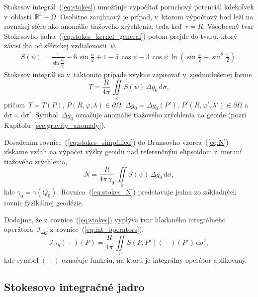 \documentclass[a4paper,12pt]{book}
\newcommand{\diff}{\mathrm d}
\begin{document}
Stokesov integrál~(\ref{eq:stokes}) umožňuje vypočítať poruchový potenciál 
kdekoľvek v~oblasti~$\mathbb{R}^3 - \overline\Omega$.  Osobitne zaujímavý je 
prípad, v~ktorom výpočtový bod leží na rovnakej sfére ako anomálie tiažového 
zrýchlenia, teda keď~$r = R$.  Všeobecný tvar Stokesovho 
jadra~(\ref{eq:stokes_kernel_general}) potom prejde do tvaru, ktorý závisí iba 
od sférickej vzdialenosti~$\psi$,
%
\begin{equation}
\label{eq:stokes_kernel}
\begin{split}
S(\psi) = \frac{1}{\sin\dfrac{\psi}{2}} - 6 \, \sin\frac{\psi}{2} + 1 - 5 \, 
\cos\psi - 3 \, \cos\psi \, \ln\left( \sin\frac{\psi}{2} + \sin^2\frac{\psi}{2} 
\right){.}
\end{split}
\end{equation}
%
Stokesov integrál sa v~taktomto prípade zvykne zapisovať v~zjednodušenej forme
%
\begin{equation}
\label{eq:stokes_simplified}
T = \frac{R}{4\pi} \, \iint\limits_{\sigma} S(\psi) \, \Delta g_0 \, \diff 
\sigma{,}
\end{equation}
%
pričom~$T = T(P)$, $P(R, \varphi, \lambda) \in \partial\Omega$, $\Delta g_0 
= \Delta g_0(P')$, $P'(R, \varphi', \lambda') \in \partial\Omega$ 
a~$\diff\sigma = \diff\sigma'$.  Symbol~$\Delta g_0$ označuje anomálie 
tiažového zrýchlenia na geoide (pozri Kapitolu~\ref{sec:gravity_anomaly}).

Dosadením rovnice~(\ref{eq:stokes_simplified}) do Brunsovho vzorca~(\ref{eq:N}) 
získame vzťah na výpočet výšky geoidu nad referenčným elipsoidom z~meraní 
tiažového zrýchlenia,
%
\begin{equation}
\label{eq:stokes_N}
N = \frac{R}{4\pi \, \gamma_0} \, \iint\limits_{\sigma} S(\psi) \, \Delta g_0 
\, \diff \sigma{,}
\end{equation}
%
kde $\gamma_0 = \gamma(Q_0)$.  Rovnica~(\ref{eq:stokes_N}) predstavuje jednu zo 
základných rovníc fyzikálnej geodézie.

Dodajme, že z~rovnice~(\ref{eq:stokes}) vyplýva tvar hľadaného integrálneho 
operátora~$\mathcal{I}_{\Delta g}$ z~rovnice~(\ref{eq:int_operators}),
%
\begin{equation}
\label{eq:iDg}
\mathcal{I}_{\Delta g}( \, \cdot \, )(P) = \frac{R}{4\pi} \, 
\iint\limits_\sigma S(P, P') ( \, \cdot \, )(P') \, \diff\sigma'{,}
\end{equation}
%
kde symbol $(\, \cdot \,)$ označuje funkciu, na ktorú je integrálny operátor 
aplikovaný.


\subsection{Stokesovo integračné jadro}
\label{sec:stokes_kernel}
\end{document}
